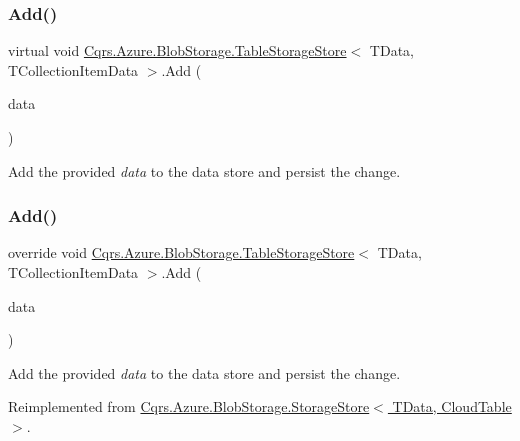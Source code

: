 \subsubsection{\texorpdfstring{Add()}{Add()}\hspace{0.1cm}{\footnotesize\ttfamily [2/6]}}
{\footnotesize\ttfamily virtual void \hyperlink{classCqrs_1_1Azure_1_1BlobStorage_1_1TableStorageStore}{Cqrs.\+Azure.\+Blob\+Storage.\+Table\+Storage\+Store}$<$ T\+Data, T\+Collection\+Item\+Data $>$.Add (\begin{DoxyParamCaption}\item[{I\+Table\+Entity}]{data }\end{DoxyParamCaption})\hspace{0.3cm}{\ttfamily [virtual]}}



Add the provided {\itshape data}  to the data store and persist the change. 

\mbox{\label{classCqrs_1_1Azure_1_1BlobStorage_1_1TableStorageStore_a2b10c02a19150d5a68e6dcb4810ea8a1_a2b10c02a19150d5a68e6dcb4810ea8a1}} 
\subsubsection{\texorpdfstring{Add()}{Add()}\hspace{0.1cm}{\footnotesize\ttfamily [3/6]}}
{\footnotesize\ttfamily override void \hyperlink{classCqrs_1_1Azure_1_1BlobStorage_1_1TableStorageStore}{Cqrs.\+Azure.\+Blob\+Storage.\+Table\+Storage\+Store}$<$ T\+Data, T\+Collection\+Item\+Data $>$.Add (\begin{DoxyParamCaption}\item[{I\+Enumerable$<$ T\+Data $>$}]{data }\end{DoxyParamCaption})\hspace{0.3cm}{\ttfamily [virtual]}}



Add the provided {\itshape data}  to the data store and persist the change. 



Reimplemented from \hyperlink{classCqrs_1_1Azure_1_1BlobStorage_1_1StorageStore_a989d749e5f9efc10b1a416feec02657d_a989d749e5f9efc10b1a416feec02657d}{Cqrs.\+Azure.\+Blob\+Storage.\+Storage\+Store$<$ T\+Data, Cloud\+Table $>$}.

